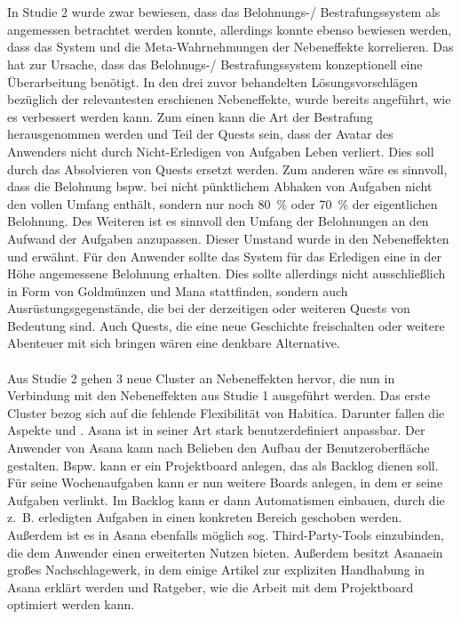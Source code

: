 \documentclass[sigconf, nonacm]{acmart}
\begin{document}
 \\
 \\
 In Studie 2 wurde zwar bewiesen, dass das Belohnungs-/ Bestrafungssystem als angemessen betrachtet werden konnte, allerdings konnte ebenso bewiesen werden, dass das System und die Meta-Wahrnehmungen der Nebeneffekte korrelieren. Das hat zur Ursache, dass das Belohnugs-/ Bestrafungssystem konzeptionell eine Überarbeitung benötigt. In den drei zuvor behandelten Lösungsvorschlägen bezüglich der relevantesten erschienen Nebeneffekte, wurde bereits angeführt, wie es verbessert werden kann. Zum einen kann die Art der Bestrafung herausgenommen werden und Teil der Quests sein, dass der Avatar des Anwenders nicht durch Nicht-Erledigen von Aufgaben Leben verliert. Dies soll durch das Absolvieren von Quests ersetzt werden. Zum anderen wäre es sinnvoll, dass die Belohnung bspw. bei nicht pünktlichem Abhaken von Aufgaben nicht den vollen Umfang enthält, sondern nur noch 80~\% oder 70~\% der eigentlichen Belohnung. Des Weiteren ist es sinnvoll den Umfang der Belohnungen an den Aufwand der Aufgaben anzupassen. Dieser Umstand wurde in den Nebeneffekten  und  erwähnt. Für den Anwender sollte das System für das Erledigen eine in der Höhe angemessene Belohnung erhalten. Dies sollte allerdings nicht ausschließlich in Form von Goldmünzen und Mana stattfinden, sondern auch Ausrüstungsgegenstände, die bei der derzeitigen oder weiteren Quests von Bedeutung sind. Auch Quests, die eine neue Geschichte freischalten oder weitere Abenteuer mit sich bringen wären eine denkbare Alternative.
 \\
 \\
Aus Studie 2 gehen 3 neue Cluster an Nebeneffekten hervor, die nun in Verbindung mit den Nebeneffekten aus Studie 1 ausgeführt werden.
Das erste Cluster bezog sich auf die fehlende Flexibilität von Habitica. Darunter fallen die Aspekte  und . Asana ist in seiner Art stark benutzerdefiniert anpassbar. Der Anwender von Asana kann nach Belieben den Aufbau der Benutzeroberfläche gestalten. Bspw. kann er ein Projektboard anlegen, das als Backlog dienen soll. Für seine Wochenaufgaben kann er nun weitere Boards anlegen, in dem er seine Aufgaben verlinkt. Im Backlog kann er dann Automatismen einbauen, durch die z.~B. erledigten Aufgaben in einen konkreten Bereich geschoben werden. Außerdem ist es in Asana ebenfalls möglich sog. Third-Party-Tools einzubinden, die dem Anwender einen erweiterten Nutzen bieten. Außerdem besitzt Asanaein großes Nachschlagewerk, in dem einige Artikel zur expliziten Handhabung in Asana erklärt werden und Ratgeber, wie die Arbeit mit dem Projektboard optimiert werden kann.
\end{document}
